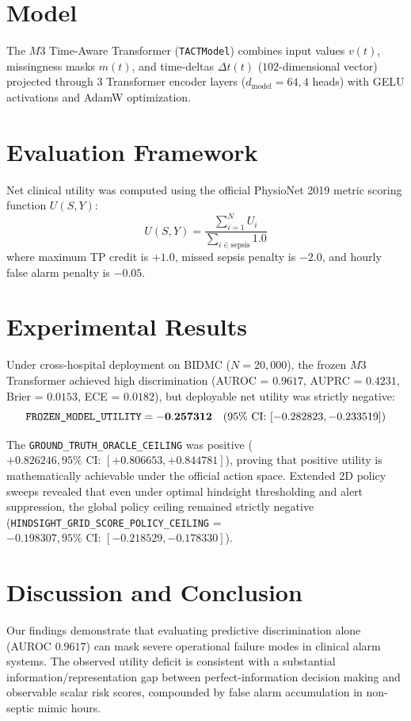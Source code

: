 \documentclass[11pt,a4paper]{article}
\begin{document}
\section{Model}
The $M3$ Time-Aware Transformer (\texttt{TACTModel}) combines input values $v(t)$, missingness masks $m(t)$, and time-deltas $\Delta t(t)$ ($102$-dimensional vector) projected through $3$ Transformer encoder layers ($d_{\text{model}}=64, 4$ heads) with GELU activations and AdamW optimization.

\section{Evaluation Framework}
Net clinical utility was computed using the official PhysioNet 2019 metric scoring function $U(S, Y)$:
\begin{equation}
U(S, Y) = \frac{\sum_{i=1}^{N} U_i}{\sum_{i \in \text{sepsis}} 1.0}
\end{equation}
where maximum TP credit is $+1.0$, missed sepsis penalty is $-2.0$, and hourly false alarm penalty is $-0.05$.

\section{Experimental Results}
Under cross-hospital deployment on BIDMC ($N=20,000$), the frozen $M3$ Transformer achieved high discrimination (AUROC = $0.9617$, AUPRC = $0.4231$, Brier = $0.0153$, ECE = $0.0182$), but deployable net utility was strictly negative:
\begin{equation}
\text{\texttt{FROZEN\_MODEL\_UTILITY}} = \mathbf{-0.257312} \quad (95\%\text{ CI: }[-0.282823, -0.233519])
\end{equation}

The \texttt{GROUND\_TRUTH\_ORACLE\_CEILING} was positive ($\mathbf{+0.826246}, 95\%\text{ CI: }[+0.806653, +0.844781]$), proving that positive utility is mathematically achievable under the official action space. Extended 2D policy sweeps revealed that even under optimal hindsight thresholding and alert suppression, the global policy ceiling remained strictly negative (\texttt{HINDSIGHT\_GRID\_SCORE\_POLICY\_CEILING} = $-0.198307, 95\%\text{ CI: }[-0.218529, -0.178330]$).

\section{Discussion and Conclusion}
Our findings demonstrate that evaluating predictive discrimination alone (AUROC $0.9617$) can mask severe operational failure modes in clinical alarm systems. The observed utility deficit is consistent with a substantial information/representation gap between perfect-information decision making and observable scalar risk scores, compounded by false alarm accumulation in non-septic mimic hours.
\end{document}
